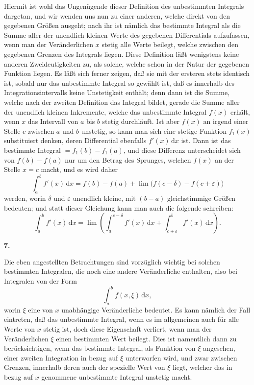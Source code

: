 \documentclass[11pt]{article}
\newcommand{\dd}{\,\mathrm d}
\newcommand{\art}[1]{\bigskip\begin{center}\large\bfseries #1.\end{center}\nopagebreak}
\begin{document}
Hiermit ist wohl das Ungenügende dieser Definition des unbestimmten Integrals dargetan, und wir wenden uns nun zu einer anderen, welche direkt von den gegebenen Größen ausgeht; nach ihr ist nämlich das bestimmte Integral als die Summe aller der unendlich kleinen Werte des gegebenen Differentials aufzufassen, wenn man der Veränderlichen $x$ stetig alle Werte beilegt, welche zwischen den gegebenen Grenzen des Integrals liegen. Diese Definition läßt wenigstens keine anderen Zweideutigkeiten zu, als solche, welche schon in der Natur der gegebenen Funktion liegen. Es läßt sich ferner zeigen, daß sie mit der ersteren stets identisch ist, sobald nur das unbestimmte Integral so gewählt ist, daß es innerhalb des Integrationsintervalls keine Unstetigkeit enthält; denn dann ist die Summe, welche nach der zweiten Definition das Integral bildet, gerade die Summe aller der unendlich kleinen Inkremente, welche das unbestimmte Integral $f(x)$ erhält, wenn $x$ das Intervall von $a$ bis $b$ stetig durchläuft. Ist aber $f(x)$ an irgend einer Stelle $c$ zwischen $a$ und $b$ unstetig, so kann man sich eine stetige Funktion $f_1(x)$ substituiert denken, deren Differential ebenfalls $f'(x)\dd x$ ist. Dann ist das bestimmte Integral $=f_1(b)-f_1(a)$, und diese Differenz unterscheidet sich von $f(b)-f(a)$ nur um den Betrag des Sprunges, welchen $f(x)$ an der Stelle $x=c$ macht, und es wird daher
\[
\int_a^b f'(x)\dd x=f(b)-f(a)+\lim\bigl(f(c-\delta)-f(c+\varepsilon)\bigr)
\]
werden, worin $\delta$ und $\varepsilon$ unendlich kleine, mit $(b-a)$ gleichstimmige Größen bedeuten; und statt dieser Gleichung kann man auch die folgende schreiben:
\[
\int_a^b f'(x)\dd x=\lim\left(\int_a^{c-\delta}f'(x)\dd x+\int_{c+\varepsilon}^b f'(x)\dd x\right).
\]

\art{7}

Die eben angestellten Betrachtungen sind vorzüglich wichtig bei solchen bestimmten Integralen, die noch eine andere Veränderliche enthalten, also bei Integralen von der Form
\[
\int_a^b f(x,\xi)\dd x,
\]
worin $\xi$ eine von $x$ unabhängige Veränderliche bedeutet. Es kann nämlich der Fall eintreten, daß das unbestimmte Integral, wenn es im allgemeinen auch für alle Werte von $x$ stetig ist, doch diese Eigenschaft verliert, wenn man der Veränderlichen $\xi$ einen bestimmten Wert beilegt. Dies ist namentlich dann zu berücksichtigen, wenn das bestimmte Integral, als Funktion von $\xi$ angesehen, einer zweiten Integration in bezug auf $\xi$ unterworfen wird, und zwar zwischen Grenzen, innerhalb deren auch der spezielle Wert von $\xi$ liegt, welcher das in bezug auf $x$ genommene unbestimmte Integral unstetig macht.
\end{document}
